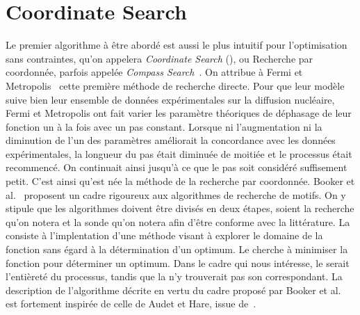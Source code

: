 \label{sec:Theme1}
\section{Coordinate Search}
Le premier algorithme à être abordé est aussi le plus intuitif pour l'optimisation sans contraintes, qu'on appelera \emph{Coordinate Search} (\CS{}), ou Recherche par coordonnée, parfois appelée \emph{Compass Search}~\cite{KoLeTo03a}. On attribue à Fermi et Metropolis~\cite{FeMe1952} cette première méthode de recherche directe. Pour que leur modèle suive bien leur ensemble de données expérimentales sur la diffusion nucléaire, Fermi et Metropolis ont fait varier les paramètre théoriques de déphasage de leur fonction un à la fois avec un pas constant. Lorsque ni l'augmentation ni la diminution de l'un des paramètres améliorait la concordance avec les données expérimentales, la longueur du pas était diminuée de moitiée et le processus était recommencé. On continuait ainsi jusqu'à ce que le pas soit considéré suffisement petit. C'est ainsi qu'est née la méthode de la recherche par coordonnée. 
Booker et al.~\cite{BoDeFrSeToTr99a} proposent un cadre rigoureux aux algorithmes de recherche de motifs. On y stipule que les algorithmes doivent être divisés en deux étapes, soient la recherche qu'on notera \SEARCH{} et la sonde qu'on notera \POLL{} afin d'être conforme avec la littérature. La \SEARCH{} consiste à l'implentation d'une méthode visant à explorer le domaine de la fonction sans égard à la détermination d'un optimum. Le \POLL{} cherche à minimiser la fonction pour déterminer un optimum. Dans le cadre qui nous intéresse, le \POLL{} serait l'entièreté du processus, tandis que la \SEARCH{} n'y trouverait pas son correspondant. La description de l'algorithme \CS{} décrite en vertu du cadre proposé par Booker et al. est fortement inspirée de celle de Audet et Hare, issue de~\cite{AuHa2018}.
